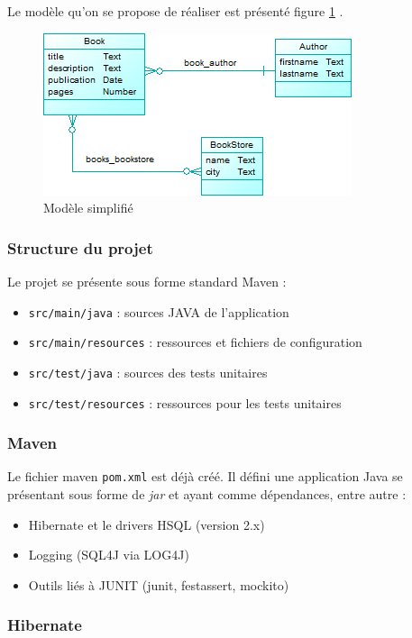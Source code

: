 \documentclass[small,algo]{dushClass}
\begin{document}
Le modèle qu'on se propose de réaliser est présenté figure \ref{model-base} .

\begin{figure}[ht]
	\center
	\includegraphics{images/simple_model.png}
	\caption{Modèle simplifié}\label{model-base}
\end{figure}


\subsubsection{Structure du projet}

Le projet se présente sous forme standard Maven :
\begin{itemize}
\item \texttt{src/main/java} : sources JAVA de l'application
\item \texttt{src/main/resources} : ressources et fichiers de configuration
\item \texttt{src/test/java} : sources des tests unitaires
\item \texttt{src/test/resources} : ressources pour les tests unitaires
\end{itemize}

\subsubsection{Maven}

Le fichier maven \texttt{pom.xml} est déjà créé. Il défini une application Java se présentant sous forme de \emph{jar} et ayant comme dépendances, entre autre :
\begin{itemize}
\item Hibernate et le drivers HSQL (version 2.x)
\item Logging (SQL4J via LOG4J)
\item Outils liés à JUNIT (junit, festassert, mockito)
\end{itemize}


\subsubsection{Hibernate}
\end{document}
